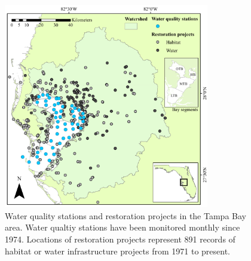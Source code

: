 \documentclass[]{article}
\begin{document}
\begin{figure}
\centerline{\includegraphics[width = 0.8\textwidth]{figs/tbrest_map.pdf}}
\caption{Water quality stations and restoration projects in the Tampa Bay area.  Water qualtiy stations have been monitored monthly since 1974.  Locations of restoration projects represent 891 records of habitat or water infrastructure projects from 1971 to present.}
\label{fig:map}
\end{figure}
\end{document}
